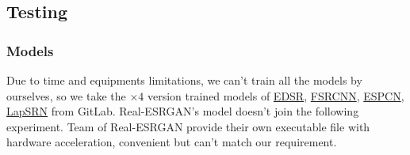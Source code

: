 \documentclass[10pt,twocolumn,letterpaper]{article}
\begin{document}
\subsection{Testing}
\subsubsection*{Models}
Due to time and equipments limitations, we can't train all the models by ourselves, so
we take the $\times 4$ version trained models of 
\href{https://github.com/Saafke/EDSR_Tensorflow/tree/master/models}{EDSR},
\href{https://github.com/Saafke/FSRCNN_Tensorflow/tree/master/models}{FSRCNN},
\href{https://github.com/fannymonori/TF-ESPCN/tree/master/export}{ESPCN},
\href{https://github.com/fannymonori/TF-LapSRN/tree/master/export}{LapSRN} from GitLab.
Real-ESRGAN's model doesn't join the following experiment. 
Team of Real-ESRGAN provide their own executable file with hardware acceleration, convenient but can't match our requirement.
\end{document}
